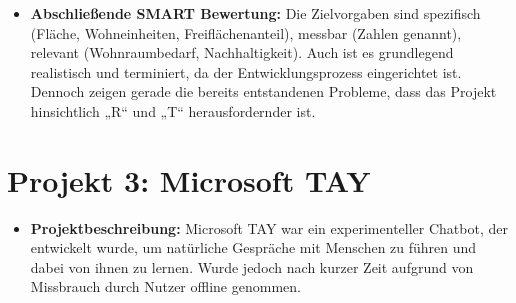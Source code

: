 \documentclass{article}
\begin{document}
\begin{itemize}
    \item \textbf{Abschließende SMART Bewertung:}
    Die Zielvorgaben sind spezifisch (Fläche, Wohneinheiten, Freiflächenanteil), 
    messbar (Zahlen genannt), relevant (Wohnraumbedarf, Nachhaltigkeit). Auch ist es grundlegend realistisch und terminiert, 
    da der Entwicklungsprozess eingerichtet ist. Dennoch zeigen gerade die bereits entstandenen Probleme, 
    dass das Projekt hinsichtlich „R“ und „T“ herausfordernder ist. 
  \end{itemize}
\clearpage

\section{Projekt 3: Microsoft TAY}
\begin{itemize}
  \item \textbf{Projektbeschreibung:} 
  Microsoft TAY war ein experimenteller Chatbot, der entwickelt wurde, um
  natürliche Gespräche mit Menschen zu führen und dabei von ihnen zu lernen. Wurde jedoch nach kurzer Zeit aufgrund von Missbrauch durch Nutzer offline genommen.
  

\end{itemize}
\end{document}
